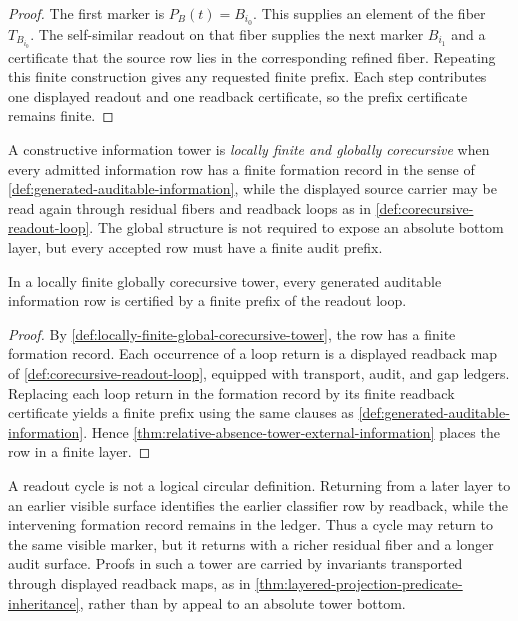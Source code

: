 \begin{proof}
The first marker is $P_B(t)=B_{i_0}$. This supplies an element of the
fiber $T_{B_{i_0}}$. The self-similar readout on that fiber supplies the
next marker $B_{i_1}$ and a certificate that the source row lies in the
corresponding refined fiber. Repeating this finite construction gives
any requested finite prefix. Each step contributes one displayed readout
and one readback certificate, so the prefix certificate remains finite.
\end{proof}

\begin{definition}
\label{def:locally-finite-global-corecursive-tower}
A constructive information tower is \emph{locally finite and globally
corecursive} when every admitted information row has a finite formation
record in the sense of \autoref{def:generated-auditable-information},
while the displayed source carrier may be read again through residual
fibers and readback loops as in
\autoref{def:corecursive-readout-loop}. The global structure is not
required to expose an absolute bottom layer, but every accepted row must
have a finite audit prefix.
\end{definition}

\begin{theorem}
\label{thm:corecursive-towers-finite-audit-prefixes}
In a locally finite globally corecursive tower, every generated
auditable information row is certified by a finite prefix of the
readout loop.
\end{theorem}

\begin{proof}
By \autoref{def:locally-finite-global-corecursive-tower}, the row has a
finite formation record. Each occurrence of a loop return is a displayed
readback map of \autoref{def:corecursive-readout-loop}, equipped with
transport, audit, and gap ledgers. Replacing each loop return in the
formation record by its finite readback certificate yields a finite
prefix using the same clauses as
\autoref{def:generated-auditable-information}. Hence
\autoref{thm:relative-absence-tower-external-information} places the row
in a finite layer.
\end{proof}

\begin{principle}
\label{prin:readout-cycles-enrich-fibers}
A readout cycle is not a logical circular definition. Returning from a
later layer to an earlier visible surface identifies the earlier
classifier row by readback, while the intervening formation record
remains in the ledger. Thus a cycle may return to the same visible
marker, but it returns with a richer residual fiber and a longer audit
surface. Proofs in such a tower are carried by invariants transported
through displayed readback maps, as in
\autoref{thm:layered-projection-predicate-inheritance}, rather than by
appeal to an absolute tower bottom.
\end{principle}

